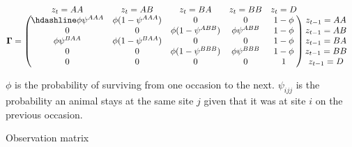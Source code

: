 \documentclass[
  12pt,
]{krantz}
\begin{document}
\[\begin{matrix}
& \\
\mathbf{\Gamma} =
\left ( \vphantom{ \begin{matrix} 12 \\ 12 \\ 12 \\ 12 \\ 12\end{matrix} } \right .
\end{matrix}
\hspace{-1.2em}
\begin{matrix}
z_t=AA & z_t=AB & z_t=BA & z_t=BB & z_t=D \\ \hdashline
\phi \psi^{AAA} & \phi (1 - \psi^{AAA}) & 0 & 0 & 1 - \phi\\
0 & 0 & \phi (1 - \psi^{ABB}) & \phi \psi^{ABB} & 1 - \phi\\
\phi \psi^{BAA} & \phi (1 - \psi^{BAA}) & 0 & 0 & 1 - \phi\\
0 & 0 & \phi (1-\psi^{BBB}) & \phi \psi^{BBB} & 1 - \phi\\
0 & 0 & 0 & 0 & 1
\end{matrix}
\hspace{-0.2em}
\begin{matrix}
& \\
\left . \vphantom{ \begin{matrix} 12 \\ 12 \\ 12 \\ 12 \\ 12\end{matrix} } \right )
\begin{matrix}
z_{t-1}=AA \\ z_{t-1}=AB \\ z_{t-1}=BA \\ z_{t-1}=BB \\ z_{t-1}=D
\end{matrix}
\end{matrix}\]

\(\phi\) is the probability of surviving from one occasion to the next. \(\psi_{ijj}\) is the probability an animal stays at the same site \(j\) given that it was at site \(i\) on the previous occasion.

Observation matrix
\end{document}
